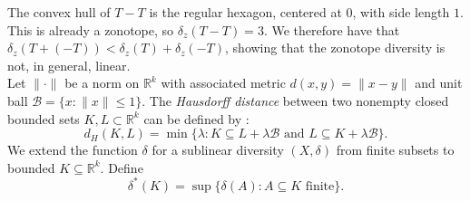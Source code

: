\documentclass[11pt]{article}
\renewcommand{\Re}{\mathbb{R}}
\newcommand{\sB}{\mathcal{B}}
\begin{document}
The convex hull of $T-T$ is the regular hexagon, centered at $0$, with side length $1$. This is already a zonotope, so $\delta_z(T - T) = 3$. We therefore have that $\delta_z(T + (-T)) < \delta_z(T) + \delta_z(-T)$, showing that  the zonotope diversity is not, in general, linear. \\




Let $\| \cdot \|$ be a norm on $\Re^k$ with associated metric $d(x,y) = \|x-y\|$ and unit ball $\sB = \{x : \|x\| \leq 1\}$. The {\em Hausdorff distance} between two nonempty closed bounded sets $K,L \subset \Re^k$ can be defined by \cite[p.\ 61]{Schneider14} : 
\[d_H(K,L) = \min \{\lambda: K \subseteq L + \lambda \sB \mbox{ and } L \subseteq K + \lambda \sB\}. \]
We extend the  function $\delta$ for a sublinear diversity $(X,\delta)$ from finite subsets to bounded $K \subseteq \Re^k$.  Define 
    \begin{equation} \delta^*(K) = \sup\{\delta(A) : A \subseteq K \mbox{ finite} \}. \label{eq:deltastar} \end{equation}
\end{document}

